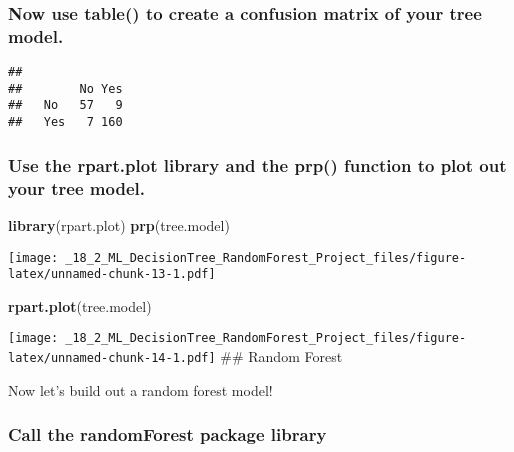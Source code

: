 \documentclass[]{article}
\newenvironment{Shaded}{\begin{snugshade}}{\end{snugshade}}
\newcommand{\KeywordTok}[1]{\textcolor[rgb]{0.13,0.29,0.53}{\textbf{#1}}}
\newcommand{\NormalTok}[1]{#1}
\newcommand{\OperatorTok}[1]{\textcolor[rgb]{0.81,0.36,0.00}{\textbf{#1}}}
\begin{document}
\hypertarget{now-use-table-to-create-a-confusion-matrix-of-your-tree-model.}{%
\subsubsection{Now use table() to create a confusion matrix of your tree
model.}\label{now-use-table-to-create-a-confusion-matrix-of-your-tree-model.}}

\begin{Shaded}
\end{Shaded}

\begin{verbatim}
##      
##        No Yes
##   No   57   9
##   Yes   7 160
\end{verbatim}

\hypertarget{use-the-rpart.plot-library-and-the-prp-function-to-plot-out-your-tree-model.}{%
\subsubsection{Use the rpart.plot library and the prp() function to plot
out your tree
model.}\label{use-the-rpart.plot-library-and-the-prp-function-to-plot-out-your-tree-model.}}

\begin{Shaded}
\begin{Highlighting}[]
\KeywordTok{library}\NormalTok{(rpart.plot)}
\KeywordTok{prp}\NormalTok{(tree.model)}
\end{Highlighting}
\end{Shaded}

\texttt{[image: \_18\_2\_ML\_DecisionTree\_RandomForest\_Project\_files/figure-latex/unnamed-chunk-13-1.pdf]}

\begin{Shaded}
\begin{Highlighting}[]
\KeywordTok{rpart.plot}\NormalTok{(tree.model)}
\end{Highlighting}
\end{Shaded}

\texttt{[image: \_18\_2\_ML\_DecisionTree\_RandomForest\_Project\_files/figure-latex/unnamed-chunk-14-1.pdf]}
\#\# Random Forest

Now let's build out a random forest model!

\hypertarget{call-the-randomforest-package-library}{%
\subsubsection{Call the randomForest package
library}\label{call-the-randomforest-package-library}}
\end{document}
